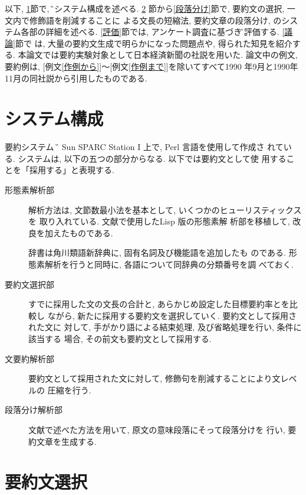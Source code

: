 以下, \ref{システム}節で, \G のシステム構成を述べる. \ref{要約文選択}
節から\ref{段落分け}節で, 要約文の選択, 一文内で修飾語を削減することに
よる文長の短縮法, 要約文章の段落分け, のシステム各部の詳細を述べる.
\ref{評価}節では, アンケート調査に基づき\G を評価する. \ref{議論}節で
は, 大量の要約文生成で明らかになった問題点や, 得られた知見を紹介する. 
本論文では要約実験対象として日本経済新聞の社説を用いた. 論文中の例文, 
要約例は, [例文\ref{作例から}]〜[例文\ref{作例まで}]を除いてすべて1990
年9月と1990年11月の同社説から引用したものである. 



\section{システム構成}\label{システム}

要約システム \G は Sun SPARC Station I 上で, Perl 言語を使用して作成さ
れている. システムは, 以下の五つの部分からなる. 以下では要約文として使
用することを「採用する」と表現する. 

\begin{description}
\item[形態素解析部]
解析方法は, 文節数最小法を基本として, いくつかのヒューリスティックスを
取り入れている. 文献\cite{手がかり語}で使用したLisp 版の形態素解
析部を移植して, 改良を加えたものである. 

辞書は角川類語新辞典\cite{角川類語}に, 固有名詞及び機能語を追加したも
のである. 形態素解析を行うと同時に, 各語について同辞典の分類番号を調
べておく. 

\item[要約文選択部]
すでに採用した文の文長の合計と, あらかじめ設定した目標要約率とを比較し
ながら, 新たに採用する要約文を選択していく. 要約文として採用された文に
対して, 手がかり語による結束処理, 及び省略処理を行い, 条件に該当する
場合, その前文も要約文として採用する. 

\item[文要約解析部]
要約文として採用された文に対して, 修飾句を削減することにより文レベルの
圧縮を行う. 

\item[段落分け解析部]
文献\cite{手がかり語}で述べた方法を用いて, 原文の意味段落にそって段落分けを
行い, 要約文章を生成する. 

\end{description}

\section{要約文選択}\label{要約文選択}

